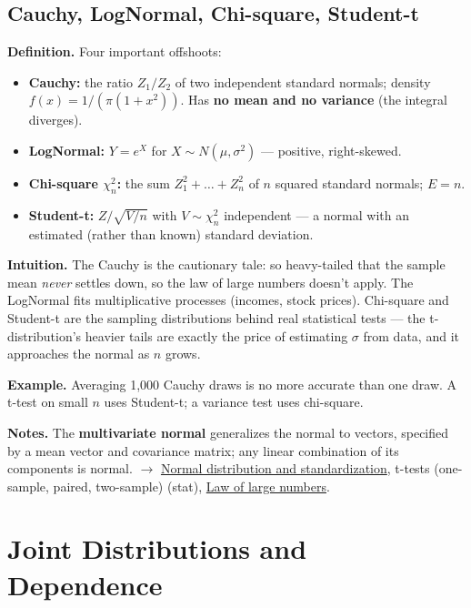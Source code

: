 \documentclass[11pt,a4paper]{article}
\begin{document}
\subsection{Cauchy, LogNormal, Chi-square, Student-t}\label{sec:cauchy-lognormal-chi-square-student-t}

\textbf{Definition.} Four important offshoots:
\begin{itemize}[leftmargin=1.4em]
\item \textbf{Cauchy:} the ratio $Z_{1}/Z_{2}$ of two independent standard normals; density $f(x) = 1/(\pi (1+x^{2}))$. Has \textbf{no mean and no variance} (the integral diverges).
\item \textbf{LogNormal:} $Y = e^X$ for $X \sim N(\mu , \sigma ^{2})$ --- positive, right-skewed.
\item \textbf{Chi-square $\chi ^{2}_n$:} the sum $Z_{1}^{2} + \ldots  + Z_n^{2}$ of $n$ squared standard normals; $E = n$.
\item \textbf{Student-t:} $Z / \sqrt{V/n}$ with $V \sim \chi ^{2}_n$ independent --- a normal with an estimated (rather than known) standard deviation.
\end{itemize}

\textbf{Intuition.} The Cauchy is the cautionary tale: so heavy-tailed that the sample mean \textit{never} settles down, so the law of large numbers doesn't apply. The LogNormal fits multiplicative processes (incomes, stock prices). Chi-square and Student-t are the sampling distributions behind real statistical tests --- the t-distribution's heavier tails are exactly the price of estimating $\sigma$ from data, and it approaches the normal as $n$ grows.

\textbf{Example.} Averaging 1,000 Cauchy draws is no more accurate than one draw. A t-test on small $n$ uses Student-t; a variance test uses chi-square.

\textbf{Notes.} The \textbf{multivariate normal} generalizes the normal to vectors, specified by a mean vector and covariance matrix; any linear combination of its components is normal. $\to$ \hyperref[sec:normal-distribution-and-standardization]{Normal distribution and standardization}, t-tests (one-sample, paired, two-sample) (stat), \hyperref[sec:law-of-large-numbers]{Law of large numbers}.


\section{Joint Distributions and Dependence}
\end{document}
